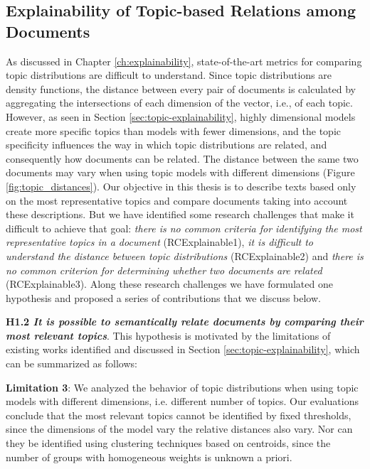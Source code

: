 \subsection{Explainability of Topic-based Relations among Documents}

As discussed in Chapter \ref{ch:explainability}, state-of-the-art metrics for comparing topic distributions are difficult to understand. Since topic distributions are density functions, the distance between every pair of documents is calculated by aggregating the intersections of each dimension of the vector, i.e., of each topic. However, as seen in Section \ref{sec:topic-explainability}, highly dimensional models create more specific topics than models with fewer dimensions, and the topic specificity influences the way in which topic distributions are related, and consequently how documents can be related. The distance between the same two documents may vary when using topic models with different dimensions (Figure \ref{fig:topic_distances}). Our objective in this thesis is to describe texts based only on the most representative topics and compare documents taking into account these descriptions. But we have identified some research challenges that make it difficult to achieve that goal: \textit{there is no common criteria for identifying the most representative topics in a document} (RCExplainable1), \textit{it is difficult to understand the distance between topic distributions} (RCExplainable2) and \textit{there is no common criterion for determining whether two documents are related} (RCExplainable3). Along these research challenges we have formulated one hypothesis and proposed a series of contributions that we discuss below.

\textbf{H1.2 \textit{It is possible to semantically relate documents by comparing their most relevant topics}}. This hypothesis is motivated by the limitations of existing works identified and discussed in Section \ref{sec:topic-explainability}, which can be summarized as follows:

\textbf{Limitation 3}: We analyzed the behavior of topic distributions when using topic models with different dimensions, i.e. different number of topics. Our evaluations conclude that the most relevant topics cannot be identified by fixed thresholds, since the dimensions of the model vary the relative distances also vary. Nor can they be identified using clustering techniques based on centroids, since the number of groups with homogeneous weights is unknown a priori.

